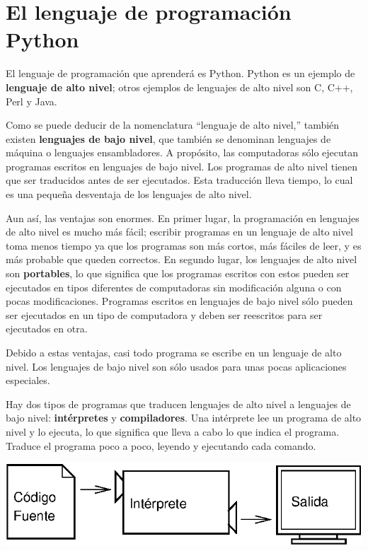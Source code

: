 \section{El lenguaje de programación Python}

El lenguaje de programación que aprenderá es Python. Python es un
ejemplo de {\bf lenguaje de alto nivel}; otros ejemplos de
lenguajes de alto nivel son C, C++, Perl y Java.

Como se puede deducir de la nomenclatura ``lenguaje de alto
nivel,'' también existen {\bf lenguajes de bajo nivel}, que
también se denominan lenguajes de máquina o lenguajes ensambladores. 
A propósito, las computadoras sólo ejecutan programas escritos en lenguajes de bajo nivel. Los programas de alto nivel
tienen que ser traducidos antes de ser ejecutados. Esta traducción
lleva tiempo, lo cual es una pequeña desventaja de los lenguajes
de alto nivel.


Aun así, las ventajas son enormes. En primer lugar, la programación
en lenguajes de alto nivel es mucho más fácil; escribir programas
en un lenguaje de alto nivel toma menos tiempo ya que los programas son
más cortos, más fáciles de leer, y es más probable que  queden correctos. 
En segundo lugar, los lenguajes de alto
nivel son {\bf portables}, lo que significa que los programas
escritos con estos pueden ser
ejecutados en tipos diferentes de computadoras sin modificación
alguna o con pocas modificaciones. Programas escritos en lenguajes
de bajo nivel sólo pueden ser ejecutados en un tipo de computadora
y deben ser reescritos para ser ejecutados en otra.

Debido a estas ventajas, casi todo programa se escribe en un
lenguaje de alto nivel. Los lenguajes de bajo nivel son sólo usados
para unas pocas aplicaciones especiales.


Hay dos tipos de programas que traducen lenguajes de alto nivel a
lenguajes de bajo nivel: {\bf intérpretes} y {\bf
compiladores}. Una intérprete lee un programa de alto nivel y lo
ejecuta, lo que significa que lleva a cabo lo que indica el
programa. Traduce el programa poco a poco, leyendo y ejecutando
cada comando.

\vspace{0.1in}
\centerline{\includegraphics[scale=0.7]{illustrations/interpret.eps}}
\vspace{0.1in}


